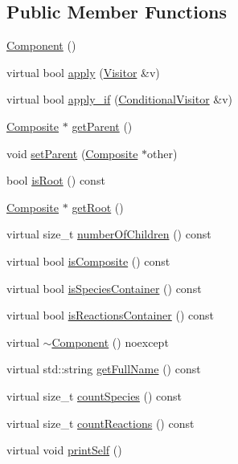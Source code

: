\subsection*{Public Member Functions}
\begin{DoxyCompactItemize}
\item 
\hyperlink{classchem_1_1Component_a2c7265280625c13151d52a500bcc3095}{Component} ()
\item 
virtual bool \hyperlink{classchem_1_1Component_ae9efcf2fb203ab7514f81f04d7e4dec2}{apply} (\hyperlink{classchem_1_1Visitor}{Visitor} \&v)
\item 
virtual bool \hyperlink{classchem_1_1Component_ac40e9d75a554324ba1d007a2d5234a38}{apply\-\_\-if} (\hyperlink{classchem_1_1ConditionalVisitor}{Conditional\-Visitor} \&v)
\item 
\hyperlink{classchem_1_1Composite}{Composite} $\ast$ \hyperlink{classchem_1_1Component_a32812270ee52f07ceae2194c56864fd6}{get\-Parent} ()
\item 
void \hyperlink{classchem_1_1Component_a1f4e4d1566f1d3026f1e2a14fa3dffd9}{set\-Parent} (\hyperlink{classchem_1_1Composite}{Composite} $\ast$other)
\item 
bool \hyperlink{classchem_1_1Component_a75cd13a0d884f82fcddd574de33fbfe6}{is\-Root} () const 
\item 
\hyperlink{classchem_1_1Composite}{Composite} $\ast$ \hyperlink{classchem_1_1Component_a7f1166f8fb4c9526cd1794ec3c2714f5}{get\-Root} ()
\item 
virtual size\-\_\-t \hyperlink{classchem_1_1Component_a720ec4ef4aaadfec3e47c31451d28637}{number\-Of\-Children} () const 
\item 
virtual bool \hyperlink{classchem_1_1Component_af2c73f75f937d457a55c1e0120833cb8}{is\-Composite} () const 
\item 
virtual bool \hyperlink{classchem_1_1Component_a3c0f652fe5b6910f07c046fe0190b7b5}{is\-Species\-Container} () const 
\item 
virtual bool \hyperlink{classchem_1_1Component_a8c79ee4335fadfcef56b14a62b742457}{is\-Reactions\-Container} () const 
\item 
virtual \hyperlink{classchem_1_1Component_a9a468e72232a30a69d4432d13ac5ffa9}{$\sim$\-Component} () noexcept
\item 
virtual std\-::string \hyperlink{classchem_1_1Component_a1d5884d373fb44fd950d5fe2b0c34e26}{get\-Full\-Name} () const 
\item 
virtual size\-\_\-t \hyperlink{classchem_1_1Component_a581a3912035ba493a2a24f1516d65ea8}{count\-Species} () const 
\item 
virtual size\-\_\-t \hyperlink{classchem_1_1Component_ab061b8b7d97db554af402ebb9723dc4c}{count\-Reactions} () const 
\item 
virtual void \hyperlink{classchem_1_1Component_a778911b6f9505f1d8a39fc39e093974e}{print\-Self} ()
\end{DoxyCompactItemize}
